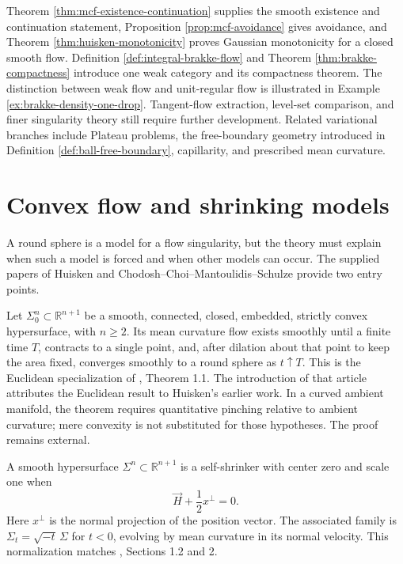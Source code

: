 \begin{remark}\label{rem:flow-program}
Theorem \ref{thm:mcf-existence-continuation} supplies the smooth existence and continuation statement, Proposition \ref{prop:mcf-avoidance} gives avoidance, and Theorem \ref{thm:huisken-monotonicity} proves Gaussian monotonicity for a closed smooth flow. Definition \ref{def:integral-brakke-flow} and Theorem \ref{thm:brakke-compactness} introduce one weak category and its compactness theorem. The distinction between weak flow and unit-regular flow is illustrated in Example \ref{ex:brakke-density-one-drop}. Tangent-flow extraction, level-set comparison, and finer singularity theory still require further development. Related variational branches include Plateau problems, the free-boundary geometry introduced in Definition \ref{def:ball-free-boundary}, capillarity, and prescribed mean curvature.
\end{remark}

\chapter{Convex flow and shrinking models}\label{sec:convex-flow-shrinkers}
A round sphere is a model for a flow singularity, but the theory must explain when such a model is forced and when other models can occur. The supplied papers of Huisken \cite{Hui86} and Chodosh--Choi--Mantoulidis--Schulze \cite{CCMS20} provide two entry points.

\begin{theorem}\label{thm:huisken-convex}
Let $\Sigma_0^n\subset\mathbb R^{n+1}$ be a smooth, connected, closed, embedded, strictly convex hypersurface, with $n\geq2$. Its mean curvature flow exists smoothly until a finite time $T$, contracts to a single point, and, after dilation about that point to keep the area fixed, converges smoothly to a round sphere as $t\uparrow T$. This is the Euclidean specialization of \cite{Hui86}, Theorem 1.1. The introduction of that article attributes the Euclidean result to Huisken's earlier work. In a curved ambient manifold, the theorem requires quantitative pinching relative to ambient curvature; mere convexity is not substituted for those hypotheses. The proof remains external.
\end{theorem}

\begin{definition}\label{def:self-shrinker}
A smooth hypersurface $\Sigma^n\subset\mathbb R^{n+1}$ is a self-shrinker with center zero and scale one when
\[
 \vec H+\frac12 x^\perp=0.
\]
Here $x^\perp$ is the normal projection of the position vector. The associated family is $\Sigma_t=\sqrt{-t}\,\Sigma$ for $t<0$, evolving by mean curvature in its normal velocity. This normalization matches \cite{CCMS20}, Sections 1.2 and 2.
\end{definition}

